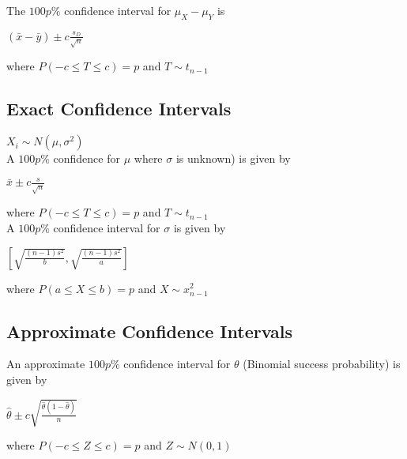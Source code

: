     The $100p\%$ confidence interval for $\mu_X - \mu_Y$ is
    \begin{center}$(\bar{x} - \bar{y}) \pm c\frac{s_D}{\sqrt{n}}$\end{center}
      where $P(-c \leq T \leq c) = p$ and $T \sim t_{n-1}$

    \subsection{Exact Confidence Intervals}
      $X_i \sim N(\mu, \sigma^2)$\\
      A $100p\%$ confidence for $\mu$ where $\sigma$ is unknown) is given by
      \begin{center}$\bar{x} \pm c\frac{s}{\sqrt{n}}$\end{center}
      where $P(-c \leq T \leq c) = p$ and $T \sim t_{n-1}$\\

      A $100p\%$ confidence interval for $\sigma$ is given by
      \begin{center}$[ \sqrt{\frac{(n-1)s^2}{b}}, \sqrt{\frac{(n-1)s^2}{a}} ]$\end{center}
        where $P(a \leq X \leq b) = p$ and $X \sim x^2_{n-1}$

    \subsection{Approximate Confidence Intervals}
      An approximate $100p\%$ confidence interval for $\theta$ (Binomial success probability) is given by
      \begin{center}$\hat{\theta} \pm c\sqrt{\frac{\hat{\theta} (1 - \hat{\theta})}{n}}$\end{center}
      where $P(-c \leq Z \leq c) = p$ and $Z \sim N(0, 1)$
